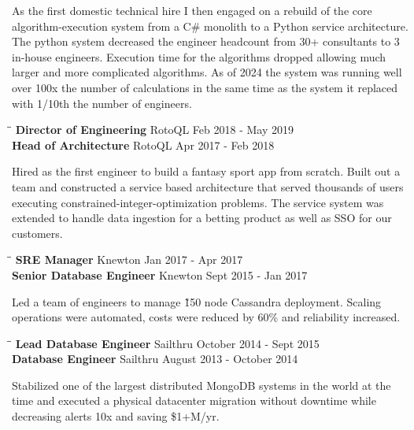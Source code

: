 \documentclass{res}
\begin{document}
\begin{resume}
As the first domestic technical hire I then engaged on a rebuild of the core algorithm-execution system from a C\# monolith to a Python service architecture. The python system decreased the engineer headcount from 30+ consultants to 3 in-house engineers. Execution time for the algorithms dropped allowing much larger and more complicated algorithms. As of 2024 the system was running well over 100x the number of calculations in the same time as the system it replaced with 1/10th the number of engineers.

\vspace{-8pt}
\begin{tabbing}
   \hspace{2.0in}\= \hspace{2.2in}\= \kill %
{\bf Director of Engineering } \> RotoQL \> Feb 2018 - May 2019 \\
{\bf Head of Architecture } \> RotoQL \> Apr 2017 - Feb 2018
\end{tabbing}\vspace{-15pt}

Hired as the first engineer to build a fantasy sport app from scratch. Built out a team and constructed a service based architecture that served thousands of users executing constrained-integer-optimization problems. The service system was extended to handle data ingestion for a betting product as well as SSO for our customers. 

\vspace{-8pt}
\begin{tabbing}
   \hspace{2.0in}\= \hspace{2.2in}\= \kill %
{\bf SRE Manager} \> Knewton \> Jan 2017 - Apr 2017 \\
{\bf Senior Database Engineer} \> Knewton \> Sept 2015 - Jan 2017
\end{tabbing}

\vspace{-15pt}
    Led a team of engineers to manage \~150 node Cassandra deployment.  Scaling operations were automated, costs were reduced by 60\% and reliability increased.

\vspace{-8pt}
\begin{tabbing}
   \hspace{2.0in}\= \hspace{2.2in}\= \kill %
{\bf Lead Database Engineer} \> Sailthru \> October 2014 - Sept 2015 \\
{\bf Database Engineer} \> Sailthru \> August 2013 - October 2014
\end{tabbing}\vspace{-15pt}
   Stabilized one of the largest distributed MongoDB systems in the world at the time and executed a physical datacenter migration without downtime while decreasing alerts 10x and saving \$1+M/yr.


\end{resume}
\end{document}

